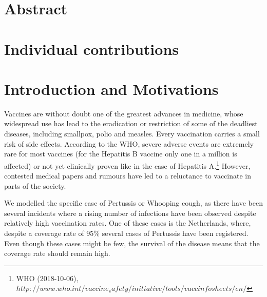 \documentclass[11pt]{article}
\begin{document}

\tableofcontents

\newpage




\section{Abstract}



\section{Individual contributions}

\section{Introduction and Motivations}

Vaccines are without doubt one of the greatest advances in medicine, whose widespread use has lead to the eradication or restriction of some of the deadliest diseases, including smallpox, polio and measles. Every vaccination carries a small risk of side effects. According to the WHO, severe adverse events are extremely rare for most vaccines (for the Hepatitis B vaccine only one in a million is affected) or not yet clinically proven like in the case of Hepatitis A.\footnote{WHO (2018-10-06), $http://www.who.int/vaccine_safety/initiative/tools/vaccinfosheets/en/$}  However, contested medical papers and rumours have led to a reluctance to vaccinate in parts of the society.

\vspace{14px}

We modelled the specific case of Pertussis or Whooping cough, as there have been several incidents where a rising number of infections have been observed despite relatively high vaccination rates. One of these cases is the Netherlands, where, despite a coverage rate of 95\% several cases of Pertussis have been registered. Even though these cases might be few, the survival of the disease means that the coverage rate should remain high. 
\end{document}
